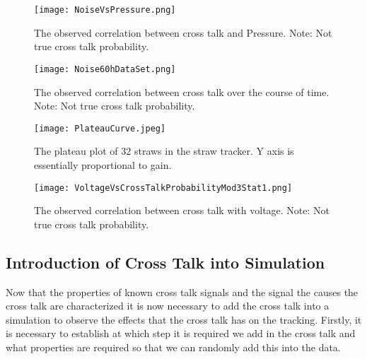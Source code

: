 \documentclass[./Thesis]{subfiles}
\begin{document}
\begin{figure}
	\centerline{\texttt{[image: NoiseVsPressure.png]}}
	\caption[ Cross Talk Vs. Pressure ]{ The observed correlation between cross talk and Pressure. Note: Not true cross talk probability.}
	\label{fig:NoisePress}
\end{figure}

\begin{figure}
	\centerline{\texttt{[image: Noise60hDataSet.png]}}
	\caption[ Cross Talk Vs. RunNumber ]{ The observed correlation between cross talk over the course of time. Note: Not true cross talk probability.}
	\label{fig:NoiseRun}
\end{figure}

\begin{figure}
	\centerline{\texttt{[image: PlateauCurve.jpeg]}}
	\caption[Plateau Plot  ]{ The plateau plot of $32$ straws in the straw tracker. Y axis is essentially proportional to gain.}
	\label{fig:plateau}
\end{figure}


\begin{figure}
	\centerline{\texttt{[image: VoltageVsCrossTalkProbabilityMod3Stat1.png]}}
	\caption[ Cross Talk Vs. Voltage (V)]{ The observed correlation between cross talk with voltage. Note: Not true cross talk probability.}
	\label{fig:NoiseVolts}
\end{figure}

	
	
\subsection{Introduction of Cross Talk into Simulation}

	Now that the  properties of known cross talk signals and the signal the causes the cross talk are characterized it is now necessary to add the cross talk into a simulation to observe the effects that the cross talk has on the tracking. Firstly, it is necessary to establish at which step it is required we add in the cross talk and what properties are required so that we can randomly add this into the data. 
	
\end{document}
